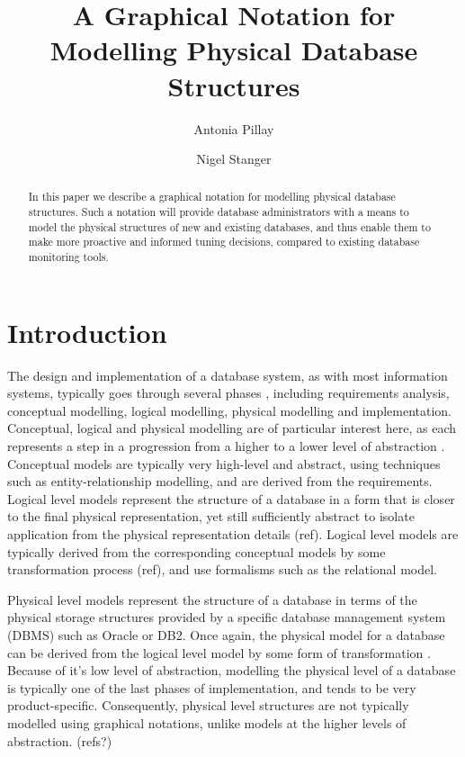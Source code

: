\documentclass{llncs}
\title{A Graphical Notation for Modelling Physical Database Structures}
\author{Antonia Pillay \and Nigel Stanger}
\institute{Department of Information Science, University of Otago, Dunedin, New Zealand \email{nstanger@infoscience.otago.ac.nz}}
\begin{document}
\maketitle

\begin{abstract}
In this paper we describe a graphical notation for modelling physical
database structures. Such a notation will provide database
administrators with a means to model the physical structures of new and
existing databases, and thus enable them to make more proactive and
informed tuning decisions, compared to existing database monitoring
tools.
\end{abstract}


\section{Introduction}

The design and implementation of a database system, as with most
information systems, typically goes through several phases
\cite{BeDa-P-2003}, including requirements analysis, conceptual
modelling, logical modelling, physical modelling and implementation.
Conceptual, logical and physical modelling are of particular interest
here, as each represents a step in a progression from a higher to a
lower level of abstraction \cite{Tsic-D-1978}. Conceptual models are
typically very high-level and abstract, using techniques such as
entity-relationship modelling, and are derived from the requirements.
Logical level models represent the structure of a database in a form
that is closer to the final physical representation, yet still
sufficiently abstract to isolate application from the physical
representation details (ref). Logical level models are typically derived
from the corresponding conceptual models by some transformation process
(ref), and use formalisms such as the relational model.

Physical level models represent the structure of a database in terms of
the physical storage structures provided by a specific database
management system (DBMS) such as Oracle or DB2. Once again, the physical
model for a database can be derived from the logical level model by some
form of transformation \cite{Bato-DS-1985,Conn-TM-2002}. Because of it's
low level of abstraction, modelling the physical level of a database is
typically one of the last phases of implementation, and tends to be very
product-specific. Consequently, physical level structures are not
typically modelled using graphical notations, unlike models at the
higher levels of abstraction. (refs?)
\end{document}
